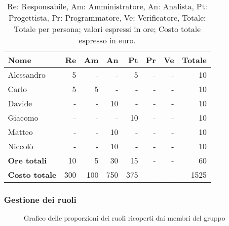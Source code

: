 \begin{table}[H]
	\centering
	\begin{tabular}{l|r|r|r|r|r|r|r}
		\textbf{Nome}         & \textbf{Re} & \textbf{Am} & \textbf{An} & \textbf{Pt} & \textbf{Pr} & \textbf{Ve} & \textbf{Totale} \\
		\hline
		Alessandro            & 5           & -           & -           & 5           & -           & -           & 10              \\
		Carlo                 & 5           & 5           & -           & -           & -           & -           & 10              \\
		Davide                & -           & -           & 10          & -           & -           & -           & 10              \\
		Giacomo               & -           & -           & -           & 10          & -           & -           & 10              \\
		Matteo                & -           & -           & 10          & -           & -           & -           & 10              \\
		Niccolò               & -           & -           & 10          & -           & -           & -           & 10              \\
		\hline
		\textbf{Ore totali}   & 10          & 5           & 30          & 15          & -           & -           & 60              \\
		\textbf{Costo totale} & 300         & 100         & 750         & 375         & -           & -           & 1525
	\end{tabular}
	\caption{Re: Responsabile, Am: Amministratore, An: Analista, Pt: Progettista,
		Pr: Programmatore, Ve: Verificatore, Totale: Totale per persona; valori espressi in ore; Costo totale espresso in euro.}
\end{table}

\subsubsection{Gestione dei ruoli}

\begin{figure}[h]
	\centering
	\caption{Grafico delle proporzioni dei ruoli ricoperti dai membri del gruppo}
\end{figure}
